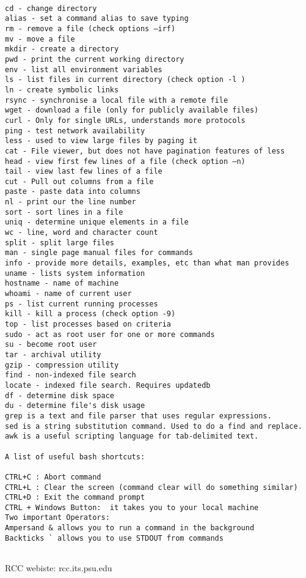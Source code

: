 \documentclass[12pt]{article}
\begin{document}
\begin{verbatim}

cd - change directory
alias - set a command alias to save typing
rm - remove a file (check options –irf)
mv - move a file
mkdir - create a directory
pwd - print the current working directory
env - list all environment variables
ls - list files in current directory (check option -l )
ln - create symbolic links
rsync - synchronise a local file with a remote file
wget - download a file (only for publicly available files)
curl - Only for single URLs, understands more protocols 
ping - test network availability
less - used to view large files by paging it
cat - File viewer, but does not have pagination features of less
head - view first few lines of a file (check option –n)
tail - view last few lines of a file
cut - Pull out columns from a file
paste - paste data into columns
nl - print our the line number
sort - sort lines in a file
uniq - determine unique elements in a file
wc - line, word and character count
split - split large files
man - single page manual files for commands
info - provide more details, examples, etc than what man provides
uname - lists system information
hostname - name of machine
whoami - name of current user
ps - list current running processes
kill - kill a process (check option -9)
top - list processes based on criteria
sudo - act as root user for one or more commands
su - become root user
tar - archival utility
gzip - compression utility
find - non-indexed file search
locate - indexed file search. Requires updatedb 
df - determine disk space
du - determine file's disk usage
grep is a text and file parser that uses regular expressions. 
sed is a string substitution command. Used to do a find and replace.
awk is a useful scripting language for tab-delimited text.

A list of useful bash shortcuts:

CTRL+C : Abort command
CTRL+L : Clear the screen (command clear will do something similar)
CTRL+D : Exit the command prompt
CTRL + Windows Button:  it takes you to your local machine 
Two important Operators:
Ampersand & allows you to run a command in the background
Backticks ` allows you to use STDOUT from commands


\end{verbatim}


 



\begin{thebibliography}{}

\bibitem{}
RCC webiste: rcc.its.psu.edu




\end{thebibliography}

 
\end{document}
